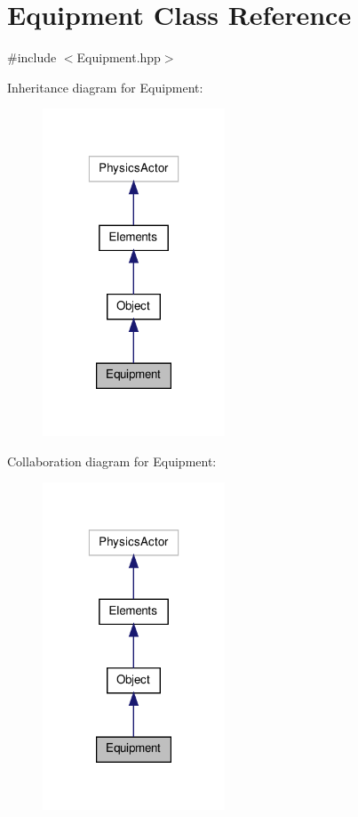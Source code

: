 \hypertarget{class_equipment}{\section{Equipment Class Reference}
\label{class_equipment}
}


{\ttfamily \#include $<$Equipment.\-hpp$>$}



Inheritance diagram for Equipment\-:
\nopagebreak
\begin{figure}[H]
\begin{center}
\leavevmode
\includegraphics[width=154pt]{class_equipment__inherit__graph}
\end{center}
\end{figure}


Collaboration diagram for Equipment\-:
\nopagebreak
\begin{figure}[H]
\begin{center}
\leavevmode
\includegraphics[width=154pt]{class_equipment__coll__graph}
\end{center}
\end{figure}
